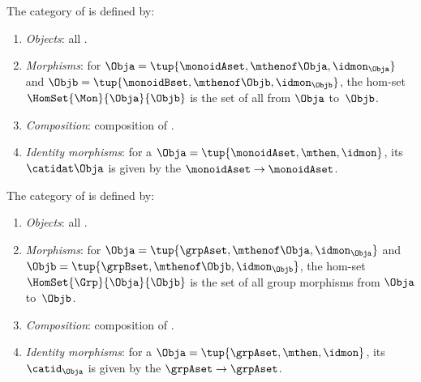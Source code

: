 \begin{ctdefinition}
    \label{def:Mon}
    The category \Mon of  is defined by:
    \begin{enumerate}
        \item \emph{Objects}: all .
        \item \emph{Morphisms}: for  $\Obja = \tup{\monoidAset, {{\mthenof \Obja}}, \idmon_\Obja}$ and $\Objb = \tup{\monoidBset, {{\mthenof \Objb}}, \idmon_\Objb}$, the hom-set $\HomSet{\Mon}{\Obja}{\Objb}$ is the set of all  from $\Obja$ to~$\Objb$.
        \item \emph{Composition}: composition of .
        \item \emph{Identity morphisms}: for a  $\Obja = \tup{\monoidAset, {\mthen}, \idmon}$, its  $\catidat\Obja$ is given by the  $\monoidAset \to \monoidAset$.
    \end{enumerate}
\end{ctdefinition}

\begin{ctdefinition}
    \label{def:Grp}
    The category \Grp of  is defined by:
    \begin{enumerate}
        \item \emph{Objects}: all .
        \item \emph{Morphisms}: for  $\Obja = \tup{\grpAset, {\mthenof \Obja}, \idmon_\Obja}$ and $\Objb = \tup{\grpBset, {\mthenof \Objb}, \idmon_\Objb}$,  the hom-set $\HomSet{\Grp}{\Obja}{\Objb}$ is the set of all group morphisms from $\Obja$ to~$\Objb$.
        \item \emph{Composition}: composition of .
        \item \emph{Identity morphisms}: for a  $\Obja = \tup{\grpAset, {\mthen}, \idmon}$, its  $\catid_\Obja$ is given by the  $\grpAset \to \grpAset$.
    \end{enumerate}
\end{ctdefinition}
